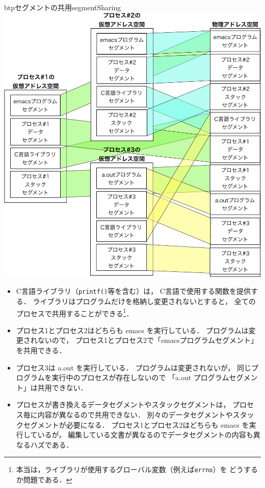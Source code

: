 \begin{myfig}{btp}{セグメントの共用}{segmentSharing}
  \includegraphics[scale=0.66]{Fig/segmentSharing-crop.pdf}
\end{myfig}

\begin{itemize}
\item C言語ライブラリ（\texttt{printf()}等を含む）は，
  C言語で使用する関数を提供する．
  ライブラリはプログラムだけを格納し変更されないとすると，
  全てのプロセスで共用することができる\footnote{
    本当は，ライブラリが使用するグローバル変数（例えば\texttt{errno}）を
    どうするか問題である．
  }．

\item プロセス1とプロセス2はどちらも emacs を実行している．
  プログラムは変更されないので，
  プロセス1とプロセス2で「emacsプログラムセグメント」を共用できる．

\item プロセス3は a.out を実行している．
  プログラムは変更されないが，
  同じプログラムを実行中のプロセスが存在しないので
  「a.out プログラムセグメント」は共用できない．

\item プロセスが書き換えるデータセグメントやスタックセグメントは，
  プロセス毎に内容が異なるので共用できない．
  別々のデータセグメントやスタックセグメントが必要になる．
  プロセス1とプロセス2はどちらも emacs を実行しているが，
  編集している文書が異なるのでデータセグメントの内容も異なるハズである．
\end{itemize}

